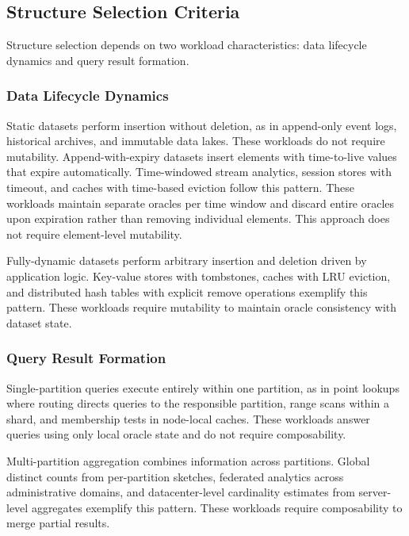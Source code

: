 \subsection{Structure Selection Criteria}
\label{subsec:decision-framework}

Structure selection depends on two workload characteristics: data lifecycle dynamics and query result formation.

\subsubsection{Data Lifecycle Dynamics}

Static datasets perform insertion without deletion, as in append-only event logs, historical archives, and immutable data lakes. These workloads do not require mutability. Append-with-expiry datasets insert elements with time-to-live values that expire automatically. Time-windowed stream analytics, session stores with timeout, and caches with time-based eviction follow this pattern. These workloads maintain separate oracles per time window and discard entire oracles upon expiration rather than removing individual elements. This approach does not require element-level mutability.

Fully-dynamic datasets perform arbitrary insertion and deletion driven by application logic. Key-value stores with tombstones, caches with LRU eviction, and distributed hash tables with explicit remove operations exemplify this pattern. These workloads require mutability to maintain oracle consistency with dataset state.

\subsubsection{Query Result Formation}

Single-partition queries execute entirely within one partition, as in point lookups where routing directs queries to the responsible partition, range scans within a shard, and membership tests in node-local caches. These workloads answer queries using only local oracle state and do not require composability.

Multi-partition aggregation combines information across partitions. Global distinct counts from per-partition sketches, federated analytics across administrative domains, and datacenter-level cardinality estimates from server-level aggregates exemplify this pattern. These workloads require composability to merge partial results.

